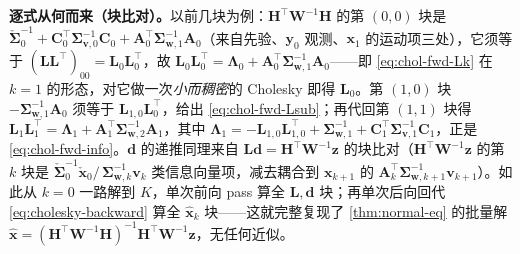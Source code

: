 \noindent\textbf{逐式从何而来（块比对）。}\;以前几块为例：$\mathbf{H}^\top\mathbf{W}^{-1}\mathbf{H}$ 的第 $(0,0)$ 块是 $\check{\boldsymbol{\Sigma}}_0^{-1}+\mathbf{C}_0^\top\boldsymbol{\Sigma}_{\mathbf{v},0}^{-1}\mathbf{C}_0+\mathbf{A}_0^\top\boldsymbol{\Sigma}_{\mathbf{w},1}^{-1}\mathbf{A}_0$（来自先验、$\mathbf{y}_0$ 观测、$\mathbf{x}_1$ 的运动项三处），它须等于 $(\mathbf{L}\mathbf{L}^\top)_{00}=\mathbf{L}_0\mathbf{L}_0^\top$，故 $\mathbf{L}_0\mathbf{L}_0^\top=\boldsymbol{\Lambda}_0+\mathbf{A}_0^\top\boldsymbol{\Sigma}_{\mathbf{w},1}^{-1}\mathbf{A}_0$——即 \cref{eq:chol-fwd-Lk} 在 $k=1$ 的形态，对它做一次\emph{小而稠密}的 Cholesky 即得 $\mathbf{L}_0$。第 $(1,0)$ 块 $-\boldsymbol{\Sigma}_{\mathbf{w},1}^{-1}\mathbf{A}_0$ 须等于 $\mathbf{L}_{1,0}\mathbf{L}_0^\top$，给出 \cref{eq:chol-fwd-Lsub}；再代回第 $(1,1)$ 块得 $\mathbf{L}_1\mathbf{L}_1^\top=\boldsymbol{\Lambda}_1+\mathbf{A}_1^\top\boldsymbol{\Sigma}_{\mathbf{w},2}^{-1}\mathbf{A}_1$，其中 $\boldsymbol{\Lambda}_1=-\mathbf{L}_{1,0}\mathbf{L}_{1,0}^\top+\boldsymbol{\Sigma}_{\mathbf{w},1}^{-1}+\mathbf{C}_1^\top\boldsymbol{\Sigma}_{\mathbf{v},1}^{-1}\mathbf{C}_1$，正是 \cref{eq:chol-fwd-info}。$\mathbf{d}$ 的递推同理来自 $\mathbf{L}\mathbf{d}=\mathbf{H}^\top\mathbf{W}^{-1}\mathbf{z}$ 的块比对（$\mathbf{H}^\top\mathbf{W}^{-1}\mathbf{z}$ 的第 $k$ 块是 $\check{\boldsymbol{\Sigma}}_0^{-1}\check{\mathbf{x}}_0/\,\boldsymbol{\Sigma}_{\mathbf{w},k}^{-1}\mathbf{v}_k$ 类信息向量项，减去耦合到 $\mathbf{x}_{k+1}$ 的 $\mathbf{A}_k^\top\boldsymbol{\Sigma}_{\mathbf{w},k+1}^{-1}\mathbf{v}_{k+1}$）。如此从 $k=0$ 一路解到 $K$，单次前向 pass 算全 $\mathbf{L},\mathbf{d}$ 块；再单次后向回代 \cref{eq:cholesky-backward} 算全 $\hat{\mathbf{x}}_k$ 块——这就完整复现了 \cref{thm:normal-eq} 的批量解 $\hat{\mathbf{x}}=(\mathbf{H}^\top\mathbf{W}^{-1}\mathbf{H})^{-1}\mathbf{H}^\top\mathbf{W}^{-1}\mathbf{z}$，无任何近似。

